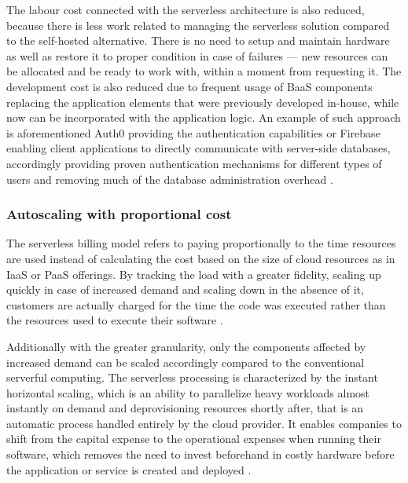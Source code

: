 The labour cost connected with the serverless architecture is also reduced, because there is less work related to managing the serverless solution compared to the self-hosted alternative. There is no need to setup and maintain hardware as well as restore it to proper condition in case of failures --- new resources can be allocated and be ready to work with, within a moment from requesting it. The development cost is also reduced due to frequent usage of BaaS components replacing the application elements that were previously developed in-house, while now can be incorporated with the application logic. An example of such approach is aforementioned Auth0 providing the authentication capabilities or Firebase enabling client applications to directly communicate with server-side databases, accordingly providing proven authentication mechanisms for different types of users and removing much of the database administration overhead \cite{MartinFowlerServerless}.

\subsubsection*{Autoscaling with proportional cost}

The serverless billing model refers to paying proportionally to the time resources are used instead of calculating the cost based on the size of cloud resources as in IaaS or PaaS offerings. By tracking the load with a greater fidelity, scaling up quickly in case of increased demand and scaling down in the absence of it, customers are actually charged for the time the code was executed rather than the resources used to execute their software \cite{BerkeleyServerless}.

Additionally with the greater granularity, only the components affected by increased demand can be scaled accordingly compared to the conventional serverful computing. The serverless processing is characterized by the instant horizontal scaling, which is an ability to parallelize heavy workloads almost instantly on demand and deprovisioning resources shortly after, that is an automatic process handled entirely by the cloud provider. It enables companies to shift from the capital expense to the operational expenses when running their software, which removes the need to invest beforehand in costly hardware before the application or service is created and deployed \cite{LeveragingServerlessCloudComputingArchitectures}.

